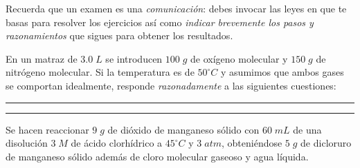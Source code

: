 \documentclass[a4paper,addpoints,14pt]{exam}
\newcommand{\halmos}{\vspace*{-6mm}
	
					\begin{flushright}
						\rule{1mm}{2.5mm} 
					\end{flushright}
					\vspace*{-4mm}
						
					  }
\renewcommand{\qed}{\halmos}
\begin{document}
\begin{problemas}{Recuerda que un examen es una \textit{comunicación}: debes invocar las leyes en que te basas para resolver los ejercicios así como \textit{indicar brevemente los pasos y razonamientos} que sigues para obtener los resultados.}
\end{problemas}
\vspace{1ex}


\begin{questions}
\question[2] En un matraz de $3.0\;L$ se introducen $100\;g$ de oxígeno molecular y $150\;g$ de nitrógeno molecular. Si la temperatura es de $50^\circ C$ y asumimos que ambos gases se comportan idealmente, responde \textit{razonadamente} a las siguientes cuestiones:
\qed


\question[2] 
\qed


\question[2]   Se hacen reaccionar $9\;g$ de dióxido de manganeso sólido con $60\;mL$ de una disolución $3\;M$ de ácido clorhídrico a $45^\circ C$ y $3\;atm$, obteniéndose $5\;g$ de dicloruro de manganeso sólido además de cloro molecular gaseoso y agua líquida.
\end{questions}
\end{document}
